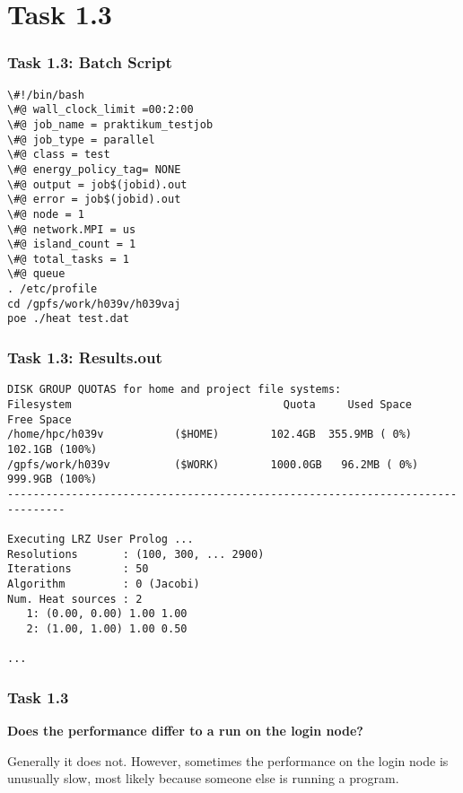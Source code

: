 \section{Task 1.3}


\begin{frame}[fragile]
\frametitle{Task 1.3: Batch Script}
\begin{lstlisting}
\#!/bin/bash
\#@ wall_clock_limit =00:2:00
\#@ job_name = praktikum_testjob
\#@ job_type = parallel
\#@ class = test
\#@ energy_policy_tag= NONE
\#@ output = job$(jobid).out
\#@ error = job$(jobid).out
\#@ node = 1
\#@ network.MPI = us
\#@ island_count = 1
\#@ total_tasks = 1
\#@ queue
. /etc/profile
cd /gpfs/work/h039v/h039vaj
poe ./heat test.dat

\end{lstlisting}
\end{frame}

\begin{frame}[fragile]
\frametitle{Task 1.3: Results.out}
\begin{lstlisting}
DISK GROUP QUOTAS for home and project file systems:
Filesystem                                 Quota     Used Space     Free Space
/home/hpc/h039v           ($HOME)        102.4GB  355.9MB ( 0%)  102.1GB (100%)
/gpfs/work/h039v          ($WORK)        1000.0GB   96.2MB ( 0%)  999.9GB (100%)
-------------------------------------------------------------------------------

Executing LRZ User Prolog ...
Resolutions       : (100, 300, ... 2900)
Iterations        : 50
Algorithm         : 0 (Jacobi)
Num. Heat sources : 2
   1: (0.00, 0.00) 1.00 1.00 
   2: (1.00, 1.00) 1.00 0.50 

...	
\end{lstlisting}
\end{frame}

\begin{frame}
\frametitle{Task 1.3}
\textbf{Does the performance differ to a run on the login node?}
\newline

Generally it does not. However, sometimes the performance on the login node is
unusually slow, most likely because someone else is running a program.
\end{frame}


